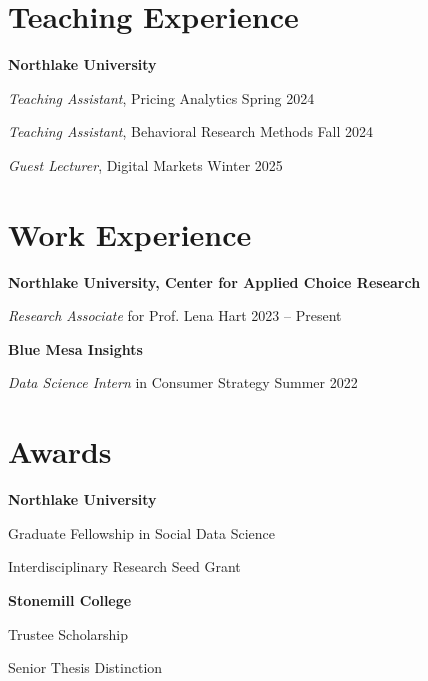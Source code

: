 \documentclass[11pt,letterpaper]{article}
\newenvironment{cvitems}
  {\begin{list}{}{\setlength{\leftmargin}{1.1em}\setlength{\itemsep}{0.25em}\setlength{\topsep}{0.15em}\setlength{\parsep}{0pt}\setlength{\partopsep}{0pt}}\small}
  {\end{list}}
\begin{document}
\section*{Teaching Experience}
\begin{cvitems}
  \item \textbf{Northlake University}
  \item \hspace*{1.5em}\textit{Teaching Assistant}, Pricing Analytics \hfill Spring 2024
  \item \hspace*{1.5em}\textit{Teaching Assistant}, Behavioral Research Methods \hfill Fall 2024
  \item \hspace*{1.5em}\textit{Guest Lecturer}, Digital Markets \hfill Winter 2025
\end{cvitems}

\section*{Work Experience}
\begin{cvitems}
  \item \textbf{Northlake University, Center for Applied Choice Research}
  \item \hspace*{1.5em}\textit{Research Associate} for Prof. Lena Hart \hfill 2023 -- Present
  \item \textbf{Blue Mesa Insights}
  \item \hspace*{1.5em}\textit{Data Science Intern} in Consumer Strategy \hfill Summer 2022
\end{cvitems}

\section*{Awards}
\begin{cvitems}
  \item \textbf{Northlake University}
  \item \hspace*{1.5em}Graduate Fellowship in Social Data Science
  \item \hspace*{1.5em}Interdisciplinary Research Seed Grant
  \item \textbf{Stonemill College}
  \item \hspace*{1.5em}Trustee Scholarship
  \item \hspace*{1.5em}Senior Thesis Distinction
\end{cvitems}
\end{document}
